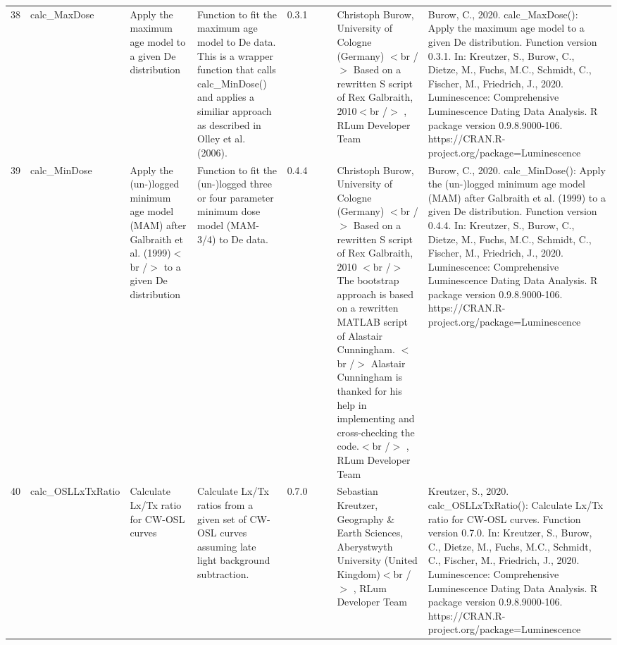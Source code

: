 \begin{table}[ht]
\begin{tabular}{rllllllll}
 \\ 
  38 & calc\_MaxDose & Apply the maximum age model to a given De distribution & Function to fit the maximum age model to De data. This is a wrapper function that calls calc\_MinDose() and applies a similiar approach as described in Olley et al. (2006). & 0.3.1
 &  &  & Christoph Burow, University of Cologne (Germany)  $<$br /$>$ Based on a rewritten S script of Rex Galbraith, 2010$<$br /$>$ , RLum Developer Team & Burow, C., 2020. calc\_MaxDose(): Apply the maximum age model to a given De distribution. Function version 0.3.1. In: Kreutzer, S., Burow, C., Dietze, M., Fuchs, M.C., Schmidt, C., Fischer, M., Friedrich, J., 2020. Luminescence: Comprehensive Luminescence Dating Data Analysis. R package version 0.9.8.9000-106. https://CRAN.R-project.org/package=Luminescence
 \\ 
  39 & calc\_MinDose & Apply the (un-)logged minimum age model (MAM) after Galbraith et al. (1999)$<$br /$>$ to a given De distribution & Function to fit the (un-)logged three or four parameter minimum dose model (MAM-3/4) to De data. & 0.4.4
 &  &  & Christoph Burow, University of Cologne (Germany)  $<$br /$>$ Based on a rewritten S script of Rex Galbraith, 2010  $<$br /$>$ The bootstrap approach is based on a rewritten MATLAB script of Alastair Cunningham.  $<$br /$>$ Alastair Cunningham is thanked for his help in implementing and cross-checking the code.$<$br /$>$ , RLum Developer Team & Burow, C., 2020. calc\_MinDose(): Apply the (un-)logged minimum age model (MAM) after Galbraith et al. (1999) to a given De distribution. Function version 0.4.4. In: Kreutzer, S., Burow, C., Dietze, M., Fuchs, M.C., Schmidt, C., Fischer, M., Friedrich, J., 2020. Luminescence: Comprehensive Luminescence Dating Data Analysis. R package version 0.9.8.9000-106. https://CRAN.R-project.org/package=Luminescence
 \\ 
  40 & calc\_OSLLxTxRatio & Calculate  Lx/Tx  ratio for CW-OSL curves & Calculate  Lx/Tx  ratios from a given set of CW-OSL curves assuming late light background subtraction. & 0.7.0
 &  &  & Sebastian Kreutzer, Geography \& Earth Sciences, Aberystwyth University (United Kingdom)$<$br /$>$ , RLum Developer Team & Kreutzer, S., 2020. calc\_OSLLxTxRatio(): Calculate Lx/Tx ratio for CW-OSL curves. Function version 0.7.0. In: Kreutzer, S., Burow, C., Dietze, M., Fuchs, M.C., Schmidt, C., Fischer, M., Friedrich, J., 2020. Luminescence: Comprehensive Luminescence Dating Data Analysis. R package version 0.9.8.9000-106. https://CRAN.R-project.org/package=Luminescence
 \\ 

\end{tabular}
\end{table}
